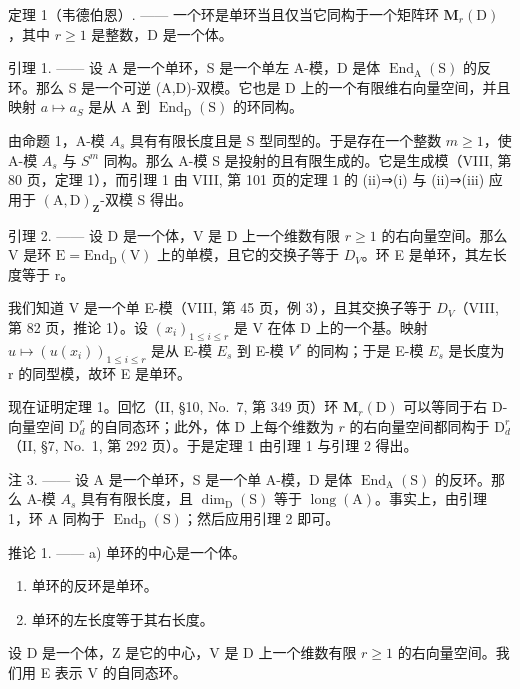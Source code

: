 定理 1（韦德伯恩）. —— 一个环是单环当且仅当它同构于一个矩阵环 \(\mathbf{M}_r(\mathrm{D})\)，其中 \(r \geqslant 1\) 是整数，D 是一个体。

引理 1. —— 设 A 是一个单环，S 是一个单左 A-模，D 是体 \(\operatorname{End}_{\mathrm{A}}(\mathrm{S})\) 的反环。那么 S 是一个可逆 (A,D)-双模。它也是 D 上的一个有限维右向量空间，并且映射 \(a \mapsto a_{S}\) 是从 A 到 \(\operatorname{End}_{\mathrm{D}}(\mathrm{S})\) 的环同构。

由命题 1，A-模 \(A_{s}\) 具有有限长度且是 S 型同型的。于是存在一个整数 \(m \geqslant 1\)，使 A-模 \(A_{s}\) 与 \(S^{m}\) 同构。那么 A-模 S 是投射的且有限生成的。它是生成模（VIII, 第 80 页，定理 1），而引理 1 由 VIII, 第 101 页的定理 1 的 (ii)⇒(i) 与 (ii)⇒(iii) 应用于 \((\mathrm{A},\mathrm{D})_{\mathbf{Z}}\)-双模 S 得出。

引理 2. —— 设 D 是一个体，V 是 D 上一个维数有限 \(r \geqslant 1\) 的右向量空间。那么 V 是环 \(\mathrm{E} = \mathrm{End}_{\mathrm{D}}(\mathrm{V})\) 上的单模，且它的交换子等于 \(D_{V}\)。环 E 是单环，其左长度等于 r。

我们知道 V 是一个单 E-模（VIII, 第 45 页，例 3），且其交换子等于 \(D_{V}\)（VIII, 第 82 页，推论 1）。设 \((x_{i})_{1\leqslant i\leqslant r}\) 是 V 在体 D 上的一个基。映射 \(u\mapsto(u(x_{i}))_{1\leqslant i\leqslant r}\) 是从 E-模 \(E_{s}\) 到 E-模 \(V^{r}\) 的同构；于是 E-模 \(E_{s}\) 是长度为 r 的同型模，故环 E 是单环。

现在证明定理 1。回忆（II, §10, No.~7, 第 349 页）环 \(\mathbf{M}_r(\mathrm{D})\) 可以等同于右 D-向量空间 \(\mathrm{D}_d^r\) 的自同态环；此外，体 D 上每个维数为 \(r\) 的右向量空间都同构于 \(\mathrm{D}_d^r\)（II, §7, No.~1, 第 292 页）。于是定理 1 由引理 1 与引理 2 得出。

注 3. —— 设 A 是一个单环，S 是一个单 A-模，D 是体 \(\operatorname{End}_{\mathrm{A}}(\mathrm{S})\) 的反环。那么 A-模 \(A_{s}\) 具有有限长度，且 \(\dim_{\mathrm{D}}(\mathrm{S})\) 等于 \(\operatorname{long}(\mathrm{A})\)。事实上，由引理 1，环 A 同构于 \(\operatorname{End}_{\mathrm{D}}(\mathrm{S})\)；然后应用引理 2 即可。

推论 1. —— a) 单环的中心是一个体。

\begin{enumerate}
\def\labelenumi{\alph{enumi})}
\setcounter{enumi}{1}
\item
  单环的反环是单环。
\item
  单环的左长度等于其右长度。
\end{enumerate}

设 D 是一个体，Z 是它的中心，V 是 D 上一个维数有限 \(r \geqslant 1\) 的右向量空间。我们用 E 表示 V 的自同态环。

